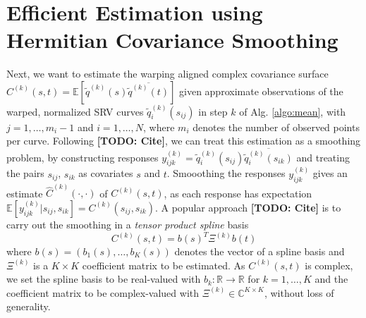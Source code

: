 \section{Efficient Estimation using Hermitian Covariance Smoothing}
\label{sec:3-cov}

Next, we want to estimate the warping aligned complex covariance surface $C^{(k)}(s,t) = \mathbb{E}[\widetilde q^{(k)}(s)\overline{\widetilde q^{(k)}(t)}]$ given approximate observations of the warped, normalized SRV curves $\widetilde q^{(k)}_i(s_{ij})$ in step $k$ of Alg. \ref{algo:mean}, with $j = 1,\dots,m_i-1$ and $i=1,\dots,N$, where $m_i$ denotes the number of observed points per curve.
Following \textbf{[TODO: Cite]}, we can treat this estimation as a smoothing problem, by constructing responses  $y^{(k)}_{ijk} = \widetilde q^{(k)}_i(s_{ij}) \overline{\widetilde q^{(k)}_i(s_{ik})}$ and treating the pairs $s_{ij}$, $s_{ik}$ as covariates $s$ and $t$.
Smooothing the responses $y^{(k)}_{ijk}$ gives an estimate $\hat C^{(k)}(\cdot, \cdot)$ of $C^{(k)}(s,t)$, as each response has expectation $\mathbb{E}[y^{(k)}_{ijk}|s_{ij},s_{ik}] = C^{(k)}(s_{ij},s_{ik})$. 
A popular approach \textbf{[TODO: Cite]} is to carry out the smoothing in a \emph{tensor product spline} basis 
\begin{equation}
  C^{(k)}(s,t) = b(s)^T \Xi^{(k)} b(t) 
\end{equation}
where $b(s) = (b_1(s),\dots,b_K(s))$ denotes the vector of a spline basis and $\Xi^{(k)}$ is a $K \times K$ coefficient matrix to be estimated.
As $C^{(k)}(s,t)$ is complex, we set the spline basis to be real-valued with $b_k : \mathbb{R} \rightarrow \mathbb{R}$ for $k = 1,\dots,K$ and the coefficient matrix to be complex-valued with $\Xi^{(k)} \in \mathbb{C}^{K \times K}$, without loss of generality.

